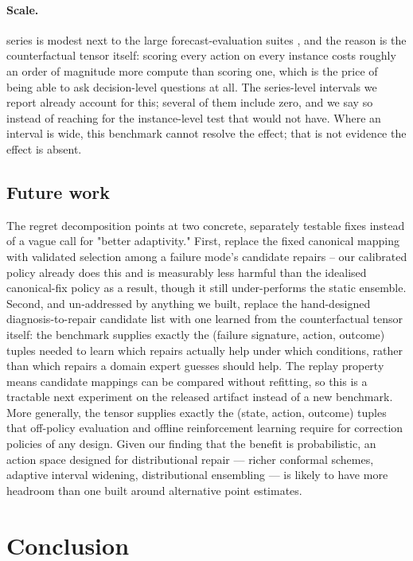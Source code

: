 \paragraph{Scale.}
\nseries{} series is modest next to the large forecast-evaluation suites
\citep{gifteval2024,monash2021}, and the reason is the counterfactual tensor itself:
scoring every action on every instance costs roughly an order of magnitude more compute
than scoring one, which is the price of being able to ask decision-level questions at
all. The series-level intervals we report already account for this; several of them
include zero, and we say so instead of reaching for the instance-level test that would
not have. Where an interval is wide, this benchmark cannot resolve the effect; that is not evidence the effect is absent.

\subsection{Future work}

The regret decomposition points at two concrete, separately testable fixes instead of a
vague call for "better adaptivity." First, replace the fixed canonical mapping with
validated selection among a failure mode's candidate repairs -- our calibrated policy
already does this and is measurably less harmful than the idealised canonical-fix policy
as a result, though it still under-performs the static ensemble. Second, and
un-addressed by anything we built, replace the hand-designed diagnosis-to-repair
candidate list with one learned from the counterfactual tensor itself: the benchmark
supplies exactly the (failure signature, action, outcome) tuples needed to learn which
repairs actually help under which conditions, rather than which repairs a domain expert
guesses should help. The replay property means candidate mappings can be compared without
refitting, so this is a tractable next experiment on the released artifact instead of a
new benchmark. More generally, the tensor supplies exactly the (state, action, outcome)
tuples that off-policy evaluation and offline reinforcement learning require for
correction policies of any design. Given our finding that the benefit is probabilistic,
an action space designed for distributional repair --- richer conformal schemes, adaptive
interval widening, distributional ensembling --- is likely to have more headroom than one
built around alternative point estimates.

\section{Conclusion}
\label{sec:conclusion}

